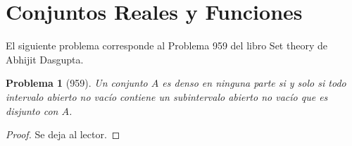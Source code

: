 \documentclass[a4,10pt]{aleph-notas}
\newtheorem*{prob}{Problema}
\begin{document}
\encabezado

\section{Conjuntos Reales y Funciones}

\noindent
El siguiente problema corresponde al Problema 959 del libro Set theory de Abhijit Dasgupta.

\begin{prob}[959]
    Un conjunto $A$ es denso en ninguna parte si y solo si todo intervalo abierto no vacío contiene un subintervalo abierto no vacío que es disjunto con $A$.
\end{prob}

\begin{proof}
    Se deja al lector.
\end{proof}
    
\end{document}
